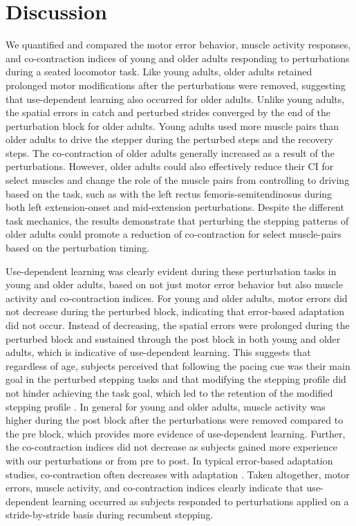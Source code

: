 \documentclass[../thesis_seyed.tex]{subfiles}
\begin{document}
\section{Discussion}
We quantified and compared the motor error behavior, muscle activity responses, and co-contraction indices of young and older adults responding to perturbations during a seated locomotor task. Like young adults, older adults retained prolonged motor modifications after the perturbations were removed, suggesting that use-dependent learning also occurred for older adults. Unlike young adults, the spatial errors in catch and perturbed strides converged by the end of the perturbation block for older adults. Young adults used more muscle pairs than older adults to drive the stepper during the perturbed steps and the recovery steps. The co-contraction of older adults generally increased as a result of the perturbations. However, older adults could also effectively reduce their CI for select muscles and change the role of the muscle pairs from controlling to driving based on the task, such as with the left rectus femoris-semitendinosus during both left extension-onset and mid-extension perturbations. Despite the different task mechanics, the results demonstrate that perturbing the stepping patterns of older adults could promote a reduction of co-contraction for select muscle-pairs based on the perturbation timing.

Use-dependent learning was clearly evident during these perturbation tasks in young and older adults, based on not just motor error behavior but also muscle activity and co-contraction indices. For young and older adults, motor errors did not decrease during the perturbed block, indicating that error-based adaptation did not occur. Instead of decreasing, the spatial errors were prolonged during the perturbed block and sustained through the post block in both young and older adults, which is indicative of use-dependent learning. This suggests that regardless of age, subjects perceived that following the pacing cue was their main goal in the perturbed stepping tasks and that modifying the stepping profile did not hinder achieving the task goal, which led to the retention of the modified stepping profile \cite{Diedrichsen2010-as}. In general for young and older adults, muscle activity was higher during the post block after the perturbations were removed compared to the pre block, which provides more evidence of use-dependent learning. Further, the co-contraction indices did not decrease as subjects gained more experience with our perturbations or from pre to post. In typical error-based adaptation studies, co-contraction often decreases with adaptation \cite{Thoroughman1999-pz,Darainy2008-li}. Taken altogether, motor errors, muscle activity, and co-contraction indices clearly indicate that use-dependent learning occurred as subjects responded to perturbations applied on a stride-by-stride basis during recumbent stepping.
\end{document}
